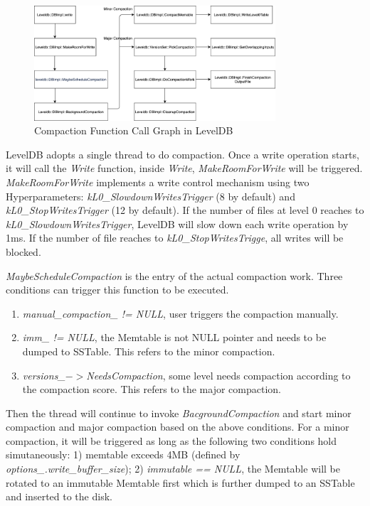 \documentclass[letter,twocolumn,10pt]{article}
\begin{document}
\begin{figure}[!htbp]
\centering
\includegraphics[width=0.8\textwidth]{./leveldb_comaction.png}
\caption{Compaction Function Call Graph in LevelDB}
\label{leveldb_comaction}
\end{figure}


LevelDB adopts a single thread to do compaction. Once a write operation starts, it will call the \textit{Write} function, inside \textit{Write}, \textit{MakeRoomForWrite} will be triggered. \textit{MakeRoomForWrite} implements a write control mechanism using two Hyperparameters: \textit{kL0\_SlowdownWritesTrigger} (8 by default) and \textit{kL0\_StopWritesTrigger} (12 by default). If the number of files at level 0 reaches to \textit{kL0\_SlowdownWritesTrigger}, LevelDB will slow down each write operation by 1ms. If the number of file reaches to \textit{kL0\_StopWritesTrigge}, all writes will be blocked. 

\textit{MaybeScheduleCompaction} is the entry of the actual compaction work. Three conditions can trigger this function to be executed.
\begin{enumerate}
\item \textit{manual\_compaction\_ != NULL}, user triggers the compaction manually.
\item \textit{imm\_ != NULL}, the Memtable is not NULL pointer and needs to be dumped to SSTable. This refers to the minor compaction.
\item \textit{versions\_$-$$>$NeedsCompaction}, some level needs compaction according to the compaction score. This refers to the major compaction.
\end{enumerate}

Then the thread will continue to invoke \textit{BacgroundCompaction} and start minor compaction and major compaction based on the above conditions.
For a minor compaction, it will be triggered as long as the following two conditions hold simutaneously: 1) memtable exceeds 4MB (defined by \textit{options\_.write\_buffer\_size}); 2) \textit{immutable == NULL}, the Memtable will be rotated to an immutable Memtable first which is further dumped to an SSTable and inserted to the disk.
 
\end{document}
